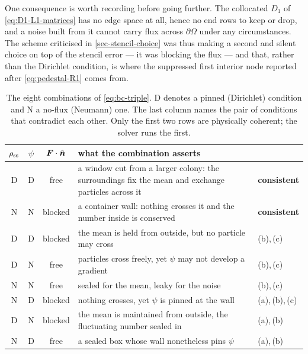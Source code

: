 \documentclass[a5paper]{article}
\begin{document}
One consequence is worth recording before going further. The collocated $D_1$ of \eqref{eq:D1-L1-matrices} has no edge space at all, hence no end rows to keep or drop, and a noise built from it cannot carry flux across $\partial\Omega$ under any circumstances. The scheme criticised in \cref{sec-stencil-choice} was thus making a second and silent choice on top of the stencil error --- it was blocking the flux --- and that, rather than the Dirichlet condition, is where the suppressed first interior node reported after \eqref{eq:pedestal-R1} comes from.

\begin{table}[h!]
\centering\footnotesize
\begin{tabular}{cccp{5.0cm}l}
\hline
$\rho_\ss$ & $\psi$ & $\bs F\cdot\nh$ & what the combination asserts & \\
\hline
D & D & free    & a window cut from a larger colony: the surroundings fix the mean and exchange particles across it & \textbf{consistent} \\
N & N & blocked & a container wall: nothing crosses it and the number inside is conserved & \textbf{consistent} \\
\hline
D & D & blocked & the mean is held from outside, but no particle may cross & (b),\,(c) \\
D & N & free    & particles cross freely, yet $\psi$ may not develop a gradient & (b),\,(c) \\
N & N & free    & sealed for the mean, leaky for the noise & (b),\,(c) \\
N & D & blocked & nothing crosses, yet $\psi$ is pinned at the wall & (a),\,(b),\,(c) \\
\hline
D & N & blocked & the mean is maintained from outside, the fluctuating number sealed in & (a),\,(b) \\
N & D & free    & a sealed box whose wall nonetheless pins $\psi$ & (a),\,(b) \\
\hline
\end{tabular}
\caption{\footnotesize The eight combinations of \eqref{eq:bc-triple}. D denotes a pinned (Dirichlet) condition and N a no-flux (Neumann) one. The last column names the pair of conditions that contradict each other. Only the first two rows are physically coherent; the solver runs the first.}
\label{tab:bc-eight}
\end{table}
\end{document}
